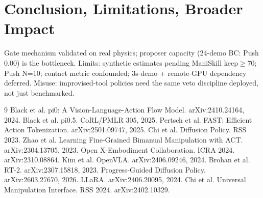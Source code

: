 \documentclass{article}
\begin{document}
\section{Conclusion, Limitations, Broader Impact}
Gate mechanism validated on real physics; proposer capacity (24-demo BC:
Push 0.00) is the bottleneck. Limits: synthetic estimates pending ManiSkill
keep$\ge$70; Push N=10; contact metric confounded; 3s-demo + remote-GPU
dependency deferred. Misuse: improvised-tool policies need the same veto
discipline deployed, not just benchmarked.
\begin{thebibliography}{9}
 Black et al. pi0: A Vision-Language-Action Flow Model. arXiv:2410.24164, 2024.
 Black et al. pi0.5. CoRL/PMLR 305, 2025.
 Pertsch et al. FAST: Efficient Action Tokenization. arXiv:2501.09747, 2025.
 Chi et al. Diffusion Policy. RSS 2023.
 Zhao et al. Learning Fine-Grained Bimanual Manipulation with ACT. arXiv:2304.13705, 2023.
 Open X-Embodiment Collaboration. ICRA 2024. arXiv:2310.08864.
 Kim et al. OpenVLA. arXiv:2406.09246, 2024.
 Brohan et al. RT-2. arXiv:2307.15818, 2023.
 Progress-Guided Diffusion Policy. arXiv:2603.27670, 2026.
 LLaRA. arXiv:2406.20095, 2024.
 Chi et al. Universal Manipulation Interface. RSS 2024. arXiv:2402.10329.
\end{thebibliography}
\end{document}
